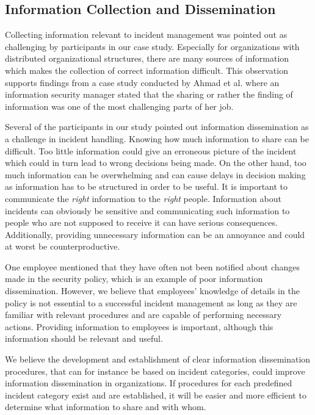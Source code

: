 \subsection{Information Collection and Dissemination}
Collecting information relevant to incident management was pointed out as challenging by participants in our case study. Especially for organizations with distributed organizational structures, there are many sources of information which makes the collection of correct information difficult. This observation supports findings from a case study conducted by Ahmad et al.\cite{ahmad2012incident} where an information security manager stated that the sharing or rather the finding of information was one of the most challenging parts of her job. 

Several of the participants in our study pointed out information dissemination as a challenge in incident handling. Knowing how much information to share can be difficult. Too little information could give an erroneous picture of the incident which could in turn lead to wrong decisions being made. On the other hand, too much information can be overwhelming and can cause delays in decision making as information has to be structured in order to be useful. It is important to communicate the \textit{right} information to the \textit{right} people. Information about incidents can obviously be sensitive and communicating such information to people who are not supposed to receive it can have serious consequences. Additionally, providing unnecessary information can be an annoyance and could at worst be counterproductive.

One employee mentioned that they have often not been notified about changes made in the security policy, which is an example of poor information dissemination. However, we believe that employees' knowledge of details in the policy is not essential to a successful incident management as long as they are familiar with relevant procedures and are capable of performing necessary actions. Providing information to employees is important, although this information should be relevant and useful.

We believe the development and establishment of clear information dissemination procedures, that can for instance be based on incident categories, could improve information dissemination in organizations. If procedures for each predefined incident category exist and are established, it will be easier and more efficient to determine what information to share and with whom.

